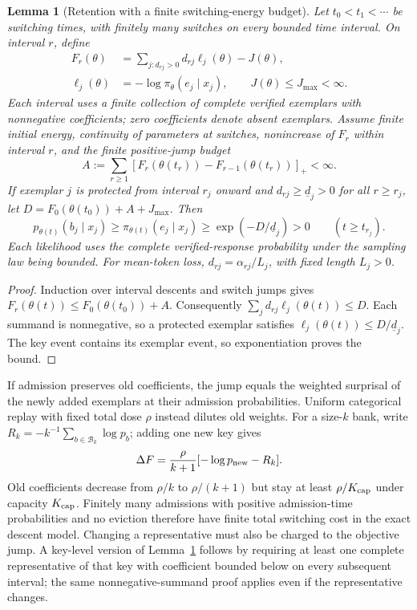 \documentclass{article}
\newcommand{\1}{\mathbf 1}
\newtheorem{lemma}{Lemma}[section]
\theoremstyle{remark}
\theoremstyle{definition}
\theoremstyle{plain}
\begin{document}
\begin{lemma}[Retention with a finite switching-energy budget]
\label{ext:lem-switching-retention}
Let $t_0<t_1<\cdots$ be switching times, with finitely many switches on every
bounded time interval. On interval $r$, define
\[
 \begin{aligned}
 F_r(\theta)&=\sum_{j:d_{rj}>0}d_{rj}\ell_j(\theta)-J(\theta),\\
 \ell_j(\theta)&=-\log\pi_\theta(e_j\mid x_j),\qquad
 J(\theta)\le J_{\max}<\infty.
 \end{aligned}
\]
Each interval uses a finite collection of complete verified exemplars with
nonnegative coefficients; zero coefficients denote absent exemplars.
Assume finite initial energy, continuity of parameters at switches,
nonincrease of $F_r$ within interval $r$, and the finite positive-jump budget
\begin{equation}
 A:=\sum_{r\ge1}
   [F_r(\theta(t_r))-F_{r-1}(\theta(t_r))]_+<\infty.
 \label{ext:eq-switching-budget}
\end{equation}
If exemplar $j$ is protected from interval $r_j$ onward and
$d_{rj}\ge\underline d_j>0$ for all $r\ge r_j$, let
$D=F_0(\theta(t_0))+A+J_{\max}$. Then
\begin{equation}
 p_{\theta(t)}(b_j\mid x_j)\ge\pi_{\theta(t)}(e_j\mid x_j)
 \ge\exp(-D/\underline d_j)>0\qquad(t\ge t_{r_j}).
 \label{ext:eq-switching-retention}
\end{equation}
Each likelihood uses the complete verified-response probability under the
sampling law being bounded. For mean-token loss, $d_{rj}=\alpha_{rj}/L_j$,
with fixed length $L_j>0$.
\end{lemma}
\begin{proof}
Induction over interval descents and switch jumps gives
$F_r(\theta(t))\le F_0(\theta(t_0))+A$. Consequently
$\sum_jd_{rj}\ell_j(\theta(t))\le D$. Each summand is nonnegative, so a
protected exemplar satisfies $\ell_j(\theta(t))\le D/\underline d_j$.
The key event contains its exemplar event, so exponentiation proves
the bound.
\end{proof}

If admission preserves old coefficients, the jump equals the weighted
surprisal of the newly added exemplars at their admission probabilities.
Uniform categorical replay with fixed total dose $\rho$ instead dilutes old
weights. For a size-$k$ bank, write
$R_k=-k^{-1}\sum_{b\in\mathcal B_k}\log p_b$; adding one new key gives
\[
 \Delta F=\frac{\rho}{k+1}[-\log p_{\rm new}-R_k].
\]
Old coefficients decrease from $\rho/k$ to $\rho/(k+1)$ but stay at least
$\rho/K_{\rm cap}$ under capacity $K_{\rm cap}$. Finitely many admissions with positive
admission-time probabilities and no eviction therefore have finite total
switching cost in the exact descent model. Changing a representative must
also be charged to the objective jump. A key-level version of
Lemma~\ref{ext:lem-switching-retention} follows by requiring at least one
complete representative of that key with coefficient bounded below on every
subsequent interval; the same nonnegative-summand proof applies even if the
representative changes.
\end{document}
